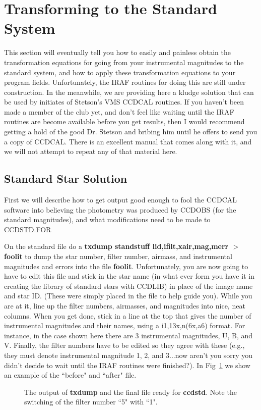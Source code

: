 \section{Transforming to the Standard System}
 
This section will eventually tell you how to easily and painless obtain
the transformation equations for going from your instrumental magnitudes
to the standard system, and how to apply these transformation equations
to your program fields.  Unfortunately, the IRAF routines for doing this
are still under construction.
In the meanwhile, we are providing here a kludge solution that can be
used by initiates of Stetson's VMS CCDCAL routines.  If you haven't been
made a member of the club yet, and don't feel like waiting until the
IRAF routines are become available before you get results, then I would
recommend getting a hold of the good Dr. Stetson and bribing him until he
offers to send you a copy of CCDCAL.  There is an excellent manual that
comes along with it, and we will not attempt to repeat any of that
material here.
 
\subsection{Standard Star Solution}
First we will describe how to get output good enough to fool
the CCDCAL software into believing the photometry was produced by CCDOBS
(for the standard magnitudes), and what modifications need to be made
to CCDSTD.FOR
 
On the standard file do a {\bf txdump standstuff lid,ifilt,xair,mag,merr
$>$ foolit} to dump the star number, filter number, airmass, and
instrumental magnitudes and errors into the file {\bf foolit}.
Unfortunately, you are now going to have to edit this file and stick in
the star name (in what ever form you have it in creating the library of
standard stars with CCDLIB) in place of the image name and star ID.
(These were simply placed in the file to help guide you).  While you are
at it, line up the filter numbers, airmasses, and magnitudes into nice,
neat columns.  When you get done, stick in a line at the top that gives
the number of instrumental magnitudes and their names, using a
i1,13x,n(6x,a6) format.  For instance, in the case shown here there
are 3 instrumental magnitudes, U, B, and V.  Finally, the filter numbers
have to be edited so they agree with these (e.g., they must denote 
instrumental magnitude 1, 2, and 3...now aren't you sorry you didn't
decide to wait until the IRAF routines were finished?).  In
Fig~\ref{groan} we show an example of the ``before" and ``after" file.
\begin{figure}
\vspace{3.5in}
\caption{\label{groan}The output of {\bf txdump} and the final file
ready for {\bf ccdstd}.  Note the switching of the filter number ``5"
with  ``1".}
\end{figure}
 
